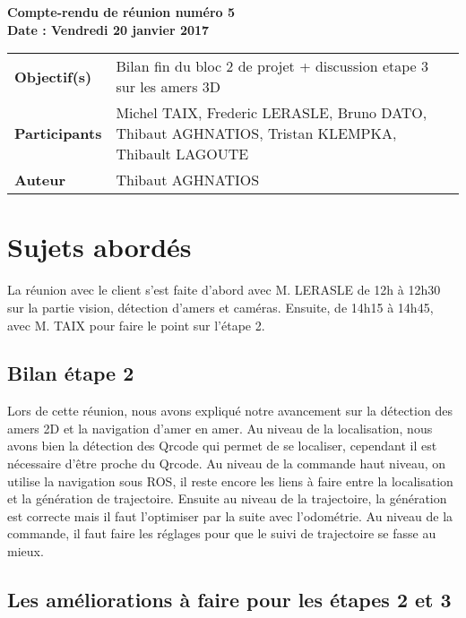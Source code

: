 \documentclass[a4wide,10pt]{article}
\begin{document}
\thispagestyle{empty}

\begin{center}
\LARGE \bfseries  Compte-rendu de réunion numéro 5 \\
\large \bfseries  Date : Vendredi 20 janvier 2017
\vspace{0.05cm}
\end{center}

\begin{center}
\begin{tabular}{ p{2.2cm}  p{13.6cm} }
\textbf{Objectif(s)} & Bilan fin du bloc 2 de projet + discussion etape 3 sur les amers 3D  \\
\textbf{Participants} & Michel TAIX, Frederic LERASLE, Bruno DATO, Thibaut AGHNATIOS, Tristan KLEMPKA, Thibault LAGOUTE  \\ 
\textbf{Auteur} & Thibaut AGHNATIOS  \\
\end{tabular}
\end{center}

\section*{Sujets abordés}

La réunion avec le client s'est faite d'abord avec M. LERASLE de 12h à 12h30 sur la partie vision, détection d'amers et caméras. Ensuite, de 14h15 à 14h45, avec M. TAIX pour faire le point sur l'étape 2.

\subsection*{Bilan étape 2}

Lors de cette réunion, nous avons expliqué notre avancement sur la détection des amers 2D et la navigation d'amer en amer. Au niveau de la localisation, nous avons bien la détection des 
Qrcode qui permet de se localiser, cependant il est nécessaire d'être proche du Qrcode. Au niveau de la commande haut niveau, on utilise la navigation sous ROS, il reste encore les liens à faire entre la localisation et la génération de trajectoire. Ensuite au niveau de la trajectoire, la génération est correcte mais il faut l'optimiser par la suite avec l'odométrie. Au niveau de la commande, il faut faire les réglages pour que le suivi de trajectoire se fasse au mieux.\\


\subsection*{Les améliorations à faire pour les étapes 2 et 3}
\end{document}
